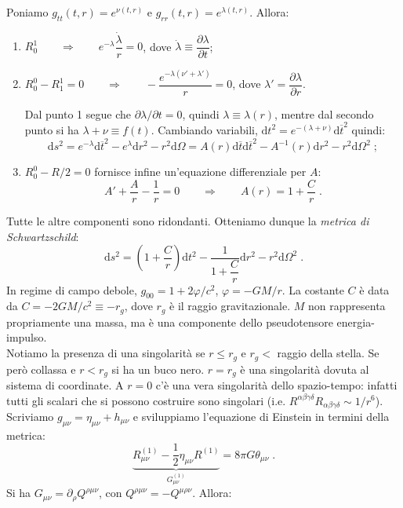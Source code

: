 \documentclass[12pt,a4paper]{report}
\theoremstyle{definition}
\newcommand{\diff}[1][]{\mathrm{d}#1}
\begin{document}
Poniamo $g_{tt}(t,r)=e^{\nu(t,r)}$ e $g_{rr}(t,r)=e^{\lambda(t,r)}$. Allora:
\begin{enumerate}
\item $R^1_0\qquad \Longrightarrow\qquad e^{-\lambda}\dfrac{\dot{\lambda}}{r}=0$, dove $\dot{\lambda}\equiv \dfrac{\partial\lambda}{\partial t}$;
\item $R_0^0-R_1^1=0\qquad \Longrightarrow\qquad -\dfrac{e^{-\lambda(\nu'+\lambda')}}{r}=0$, dove $\lambda'=\dfrac{\partial \lambda}{\partial r}$.

Dal punto 1 segue che $\partial\lambda/\partial t=0$, quindi $\lambda\equiv\lambda(r)$, mentre dal secondo punto si ha $\lambda+\nu\equiv f(t)$. Cambiando variabili, $\diff{t}^2=e^{-(\lambda+\nu)}\diff{\overline{t}}^2$ quindi:
$$
\diff{s}^2 = e^{-\lambda}\diff{\overline{t}}^2-e^{\lambda}\diff{r}^2-r^2\diff{\Omega}= A(r)\diff{\overline{t}}\diff{\overline{t}}^2-A^{-1}(r)\diff{r}^2-r^2\diff{\Omega}^2\;;
$$
\item $R_0^0-R/2=0$ fornisce infine un'equazione differenziale per $A$:
$$
A'+\frac{A}{r}-\frac{1}{r}=0\qquad \Longrightarrow\qquad A(r)=1+\frac{C}{r}\;.
$$
\end{enumerate}
Tutte le altre componenti sono ridondanti. Otteniamo dunque la \emph{metrica di Schwartzschild}:
\begin{equation}
\diff{s}^2=\left(1+\frac{C}{r}\right)\diff{t}^2-\frac{1}{1+\dfrac{C}{r}}\diff{r}^2-r^2\diff{\Omega}^2\;.
\end{equation}
In regime di campo debole, $g_{00}=1+2\varphi/c^2$, $\varphi=-GM/r$. La costante $C$ è data da $C=-2GM/c^2\equiv -r_g$, dove $r_g$ è il raggio gravitazionale. $M$ non rappresenta propriamente una massa, ma è una componente dello pseudotensore energia-impulso. \\
Notiamo la presenza di una singolarità se $r\le r_g$ e $r_g<$ raggio della stella. Se però collassa e $r<r_g$ si ha un buco nero. $r=r_g$ è una singolarità dovuta al sistema di coordinate. A $r=0$ c'è una vera singolarità dello spazio-tempo: infatti tutti gli scalari che si possono costruire sono singolari (i.e. $R^{\alpha\beta\gamma\delta}R_{\alpha\beta\gamma\delta}\sim 1/r^6$). \\
Scriviamo $g_{\mu\nu}=\eta_{\mu\nu}+h_{\mu\nu}$ e sviluppiamo l'equazione di Einstein in termini della metrica:
\begin{equation}
\underbrace{R_{\mu\nu}^{(1)}-\frac{1}{2}\eta_{\mu\nu}R^{(1)}}_{G_{\mu\nu}^{(1)}}=8\pi G\theta_{\mu\nu}\;.
\end{equation}
Si ha $G_{\mu\nu}=\partial_{\rho}Q^{\rho\mu\nu}$, con $Q^{\rho\mu\nu}=-Q^{\mu\rho\nu}$. Allora:
\end{document}
